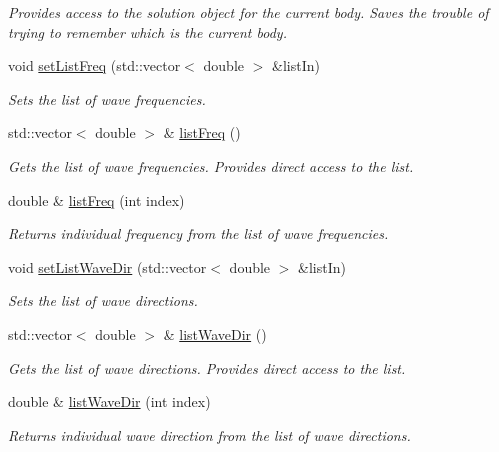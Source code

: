 \begin{DoxyCompactItemize}
\begin{DoxyCompactList}\small\item\em Provides access to the solution object for the current body. Saves the trouble of trying to remember which is the current body. \end{DoxyCompactList}\item 
void \hyperlink{classosea_1_1ofreq_1_1_outputs_body_a66e80853f6e8cad402a67c45502d0f03}{set\-List\-Freq} (std\-::vector$<$ double $>$ \&list\-In)
\begin{DoxyCompactList}\small\item\em Sets the list of wave frequencies. \end{DoxyCompactList}\item 
std\-::vector$<$ double $>$ \& \hyperlink{classosea_1_1ofreq_1_1_outputs_body_a6b28621ef475c1d917270e2259e1629f}{list\-Freq} ()
\begin{DoxyCompactList}\small\item\em Gets the list of wave frequencies. Provides direct access to the list. \end{DoxyCompactList}\item 
double \& \hyperlink{classosea_1_1ofreq_1_1_outputs_body_aea5ac6ef687c5dc979817b967bc9dfe2}{list\-Freq} (int index)
\begin{DoxyCompactList}\small\item\em Returns individual frequency from the list of wave frequencies. \end{DoxyCompactList}\item 
void \hyperlink{classosea_1_1ofreq_1_1_outputs_body_aec7bf6b2bb30646a4f45045810265d84}{set\-List\-Wave\-Dir} (std\-::vector$<$ double $>$ \&list\-In)
\begin{DoxyCompactList}\small\item\em Sets the list of wave directions. \end{DoxyCompactList}\item 
std\-::vector$<$ double $>$ \& \hyperlink{classosea_1_1ofreq_1_1_outputs_body_a710a66d19fb8ba5a6c9c15e0143f832e}{list\-Wave\-Dir} ()
\begin{DoxyCompactList}\small\item\em Gets the list of wave directions. Provides direct access to the list. \end{DoxyCompactList}\item 
double \& \hyperlink{classosea_1_1ofreq_1_1_outputs_body_abc0b04ccd535145e9c9528cde8cd4d15}{list\-Wave\-Dir} (int index)
\begin{DoxyCompactList}\small\item\em Returns individual wave direction from the list of wave directions. \end{DoxyCompactList}\item 

\end{DoxyCompactItemize}
